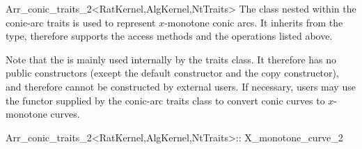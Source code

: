 \begin{ccRefClass}{Arr_conic_traits_2<RatKernel,AlgKernel,NtTraits>}
The  class nested within the conic-arc traits is
used to represent $x$-monotone conic arcs. It inherits from the 
type, therefore supports the access methods and the operations listed above.

Note that the  is mainly used internally by the
traits class. It therefore has no public constructors (except the default
constructor and the copy constructor), and therefore cannot be constructed
by external users. If necessary, users may use the 
functor supplied by the conic-arc traits class to convert conic curves to
$x$-monotone curves.

\begin{ccClass}{Arr_conic_traits_2<RatKernel,AlgKernel,NtTraits>::
                X_monotone_curve_2}
\end{ccClass}

\end{ccRefClass}

\ccRefPageEnd
